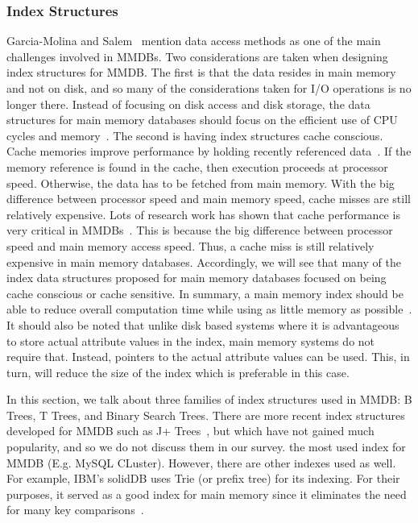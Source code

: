 \documentclass[12pt,a4paper]{article}
\begin{document}
\subsubsection{Index Structures}

Garcia-Molina and Salem~\cite{garcia1992main} mention data access methods as one of the main challenges involved in MMDBs. Two considerations are taken when
designing index structures for MMDB. The first is that the data resides in main memory and not on disk, and so many of the
considerations taken for I/O operations is no longer there. Instead of focusing on disk access and disk storage, the data structures for main memory
databases should focus on the efficient use of CPU cycles and memory~\cite{lehman1986study}. The second is having index structures cache conscious. Cache
memories improve performance by holding recently referenced data~\cite{smith1982cache}. If the memory reference is found in the cache, then execution proceeds
at processor speed. Otherwise, the data has to be fetched from main memory. With the big difference between processor speed and main memory speed, cache misses
are still relatively expensive. Lots of research work has shown that cache performance is very critical in MMDBs~\cite{boncz1999database,rao1999cache}. This is
because the big difference between processor speed and main memory access speed. Thus, a cache miss is still relatively expensive in main memory databases.
Accordingly, we will see that many of the index data structures proposed for main memory databases focused on being cache conscious or cache sensitive. In
summary, a main memory index should be able to reduce overall computation time while using as little memory as possible~\cite{lehman1986study}. It should also
be noted that unlike disk based systems where it is advantageous to store actual attribute values in the index, main memory systems do not require that.
Instead, pointers to the actual attribute values can be used. This, in turn, will reduce the size of the index which is preferable in this case.

In this section, we talk about three families of index structures used in MMDB: B Trees, T Trees, and Binary Search Trees. There are more recent index
structures developed for MMDB such as J+ Trees~\cite{luan2009prefetching}, but which have not gained much popularity, and so we do not discuss them in our
survey. %
the most used index for MMDB (E.g. MySQL CLuster). However, there are other indexes used as well. For example, IBM's solidDB uses Trie (or prefix tree) for its
indexing. For their purposes, it served as a good index for main memory since it eliminates the need for many key comparisons~\cite{ibmsoliddb}.
\end{document}
